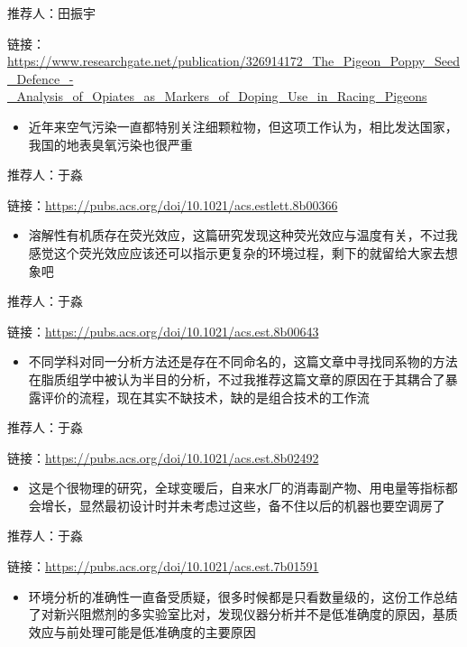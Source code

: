\documentclass[]{book}
\providecommand{\tightlist}{%
  \setlength{\itemsep}{0pt}\setlength{\parskip}{0pt}}
\begin{document}
推荐人：田振宇

链接：\url{https://www.researchgate.net/publication/326914172_The_Pigeon_Poppy_Seed_Defence_-_Analysis_of_Opiates_as_Markers_of_Doping_Use_in_Racing_Pigeons}

\begin{itemize}
\tightlist
\item
  近年来空气污染一直都特别关注细颗粒物，但这项工作认为，相比发达国家，我国的地表臭氧污染也很严重
\end{itemize}

推荐人：于淼

链接：\url{https://pubs.acs.org/doi/10.1021/acs.estlett.8b00366}

\begin{itemize}
\tightlist
\item
  溶解性有机质存在荧光效应，这篇研究发现这种荧光效应与温度有关，不过我感觉这个荧光效应应该还可以指示更复杂的环境过程，剩下的就留给大家去想象吧
\end{itemize}

推荐人：于淼

链接：\url{https://pubs.acs.org/doi/10.1021/acs.est.8b00643}

\begin{itemize}
\tightlist
\item
  不同学科对同一分析方法还是存在不同命名的，这篇文章中寻找同系物的方法在脂质组学中被认为半目的分析，不过我推荐这篇文章的原因在于其耦合了暴露评价的流程，现在其实不缺技术，缺的是组合技术的工作流
\end{itemize}

推荐人：于淼

链接：\url{https://pubs.acs.org/doi/10.1021/acs.est.8b02492}

\begin{itemize}
\tightlist
\item
  这是个很物理的研究，全球变暖后，自来水厂的消毒副产物、用电量等指标都会增长，显然最初设计时并未考虑过这些，备不住以后的机器也要空调房了
\end{itemize}

推荐人：于淼

链接：\url{https://pubs.acs.org/doi/10.1021/acs.est.7b01591}

\begin{itemize}
\tightlist
\item
  环境分析的准确性一直备受质疑，很多时候都是只看数量级的，这份工作总结了对新兴阻燃剂的多实验室比对，发现仪器分析并不是低准确度的原因，基质效应与前处理可能是低准确度的主要原因
\end{itemize}
\end{document}
